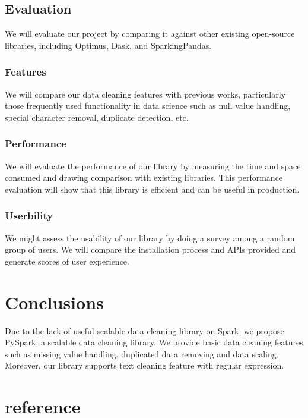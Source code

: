 \documentclass[sigconf]{acmart}
\begin{document}
\subsection{Evaluation}
We will evaluate our project by comparing it against other existing open-source libraries, including Optimus\cite{optimus}, Dask\cite{dask}, and SparkingPandas\cite{sparklingpandas}. 
\subsubsection{Features}
We will compare our data cleaning features with previous works, particularly those frequently used functionality in data science such as null value handling, special character removal, duplicate detection, etc. 
\subsubsection{Performance}
We will evaluate the performance of our library by measuring the time and space consumed and drawing comparison with existing libraries. This performance evaluation will show that this library is efficient and can be useful in production. 
\subsubsection{Userbility}
We might assess the usability of our library by doing a survey among a random group of users. We will compare the installation process and APIs provided and generate scores of user experience.

\section{Conclusions}
Due to the lack of useful scalable data cleaning library on Spark, we propose PySpark, a scalable data cleaning library. We provide basic data cleaning features such as missing value handling, duplicated data removing and data scaling. Moreover, our library supports text cleaning feature with regular expression.

\section{reference}


\end{document}
